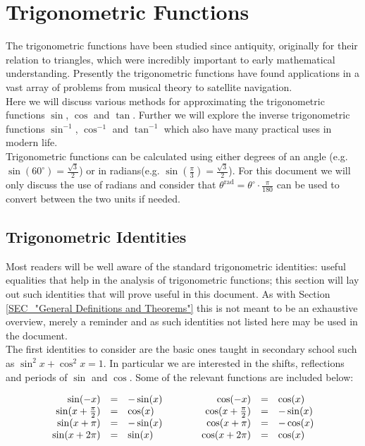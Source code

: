 \section{Trigonometric Functions}

The trigonometric functions have been studied since antiquity, originally for their relation to triangles, which were incredibly important to early mathematical understanding. Presently the trigonometric functions have found applications in a vast array of problems from musical theory to satellite navigation.\\

Here we will discuss various methods for approximating the trigonometric functions \(\sin\), \(\cos\) and \(\tan\). Further we will explore the inverse trigonometric functions \(\sin^{-1}\), \(\cos^{-1}\) and \(\tan^{-1}\) which also have many practical uses in modern life.\\

Trigonometric functions can be calculated using either degrees of an angle (e.g. \(\sin(60^{\circ}) = \frac{\sqrt{3}}{2}\)) or in radians(e.g. \(\sin(\frac{\pi}{3}) = \frac{\sqrt{3}}{2}\)). For this document we will only discuss the use of radians and consider that \(\theta^\textrm{rad} = \theta^\circ \cdot \frac{\pi}{180}\) can be used to convert between the two units if needed.

\subsection{Trigonometric Identities}

Most readers will be well aware of the standard trigonometric identities: useful equalities that help in the analysis of trigonometric functions; this section will lay out such identities that will prove useful in this document. As with Section \ref{SEC_"General Definitions and Theorems"} this is not meant to be an exhaustive overview, merely a reminder and as such identities not listed here may be used in the document.\\

The first identities to consider are the basic ones taught in secondary school such as \(\sin^2x + \cos^2x = 1\). In particular we are interested in the shifts, reflections and periods of \(\sin\) and \(\cos\). Some of the relevant functions are included below:

\begin{displaymath}
\begin{array}{rcl@{\hspace{4em}}rcl}
	\sin(-x) &=& -\sin(x) &\cos(-x) &=& \cos(x)\\
	\sin(x + \tfrac{\pi}{2}) &=& \cos(x) 
		&\cos(x + \tfrac{\pi}{2}) &=& -\sin(x)\\
	\sin(x + \pi) &=& -\sin(x) &\cos(x + \pi) &=& -\cos(x)\\
	\sin(x + 2\pi) &=& \sin(x) &\cos(x + 2\pi) &=& \cos(x)
\end{array}
\end{displaymath}

